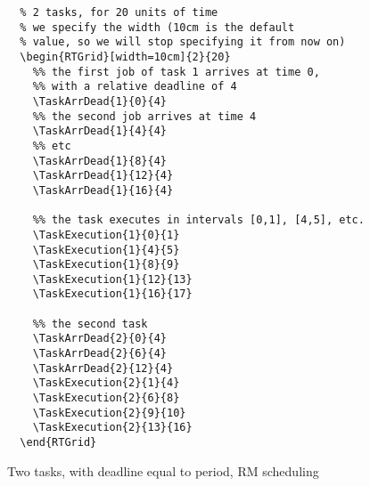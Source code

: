 \documentclass{article}
\begin{document}
\begin{figure}[h]
  \centering
  \begin{RTGrid}[width=10cm]{2}{20}


  \end{RTGrid}
\begin{verbatim}
  % 2 tasks, for 20 units of time
  % we specify the width (10cm is the default
  % value, so we will stop specifying it from now on)
  \begin{RTGrid}[width=10cm]{2}{20}
    %% the first job of task 1 arrives at time 0, 
    %% with a relative deadline of 4 
    \TaskArrDead{1}{0}{4}     
    %% the second job arrives at time 4
    \TaskArrDead{1}{4}{4}
    %% etc
    \TaskArrDead{1}{8}{4}
    \TaskArrDead{1}{12}{4}
    \TaskArrDead{1}{16}{4}

    %% the task executes in intervals [0,1], [4,5], etc.
    \TaskExecution{1}{0}{1}
    \TaskExecution{1}{4}{5}
    \TaskExecution{1}{8}{9}
    \TaskExecution{1}{12}{13}
    \TaskExecution{1}{16}{17}

    %% the second task
    \TaskArrDead{2}{0}{4}
    \TaskArrDead{2}{6}{4}
    \TaskArrDead{2}{12}{4}
    \TaskExecution{2}{1}{4}
    \TaskExecution{2}{6}{8}
    \TaskExecution{2}{9}{10}
    \TaskExecution{2}{13}{16}
  \end{RTGrid}
\end{verbatim}
  \caption{Two tasks, with deadline equal to period, RM scheduling}
  \label{fig:ex1}
\end{figure}
\end{document}
